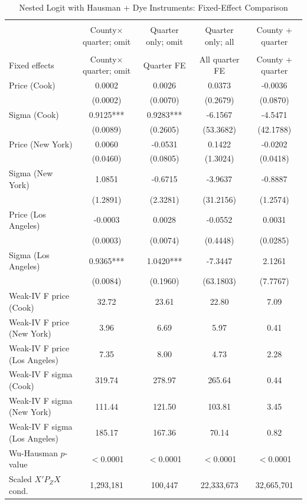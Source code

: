 \begin{table}[!htbp] \centering
  \caption{Nested Logit with Hausman + Dye Instruments: Fixed-Effect Comparison}
  \label{tab:nested_fe_comparison}
  \begin{tabular}{lcccc}
\\[-1.8ex]\hline
\hline \\[-1.8ex]
 & County$\times$quarter; omit & Quarter only; omit & Quarter only; all & County + quarter \\
\hline \\[-1.8ex]
Fixed effects & County$\times$quarter; omit & Quarter FE & All quarter FE & County + quarter \\
Price (Cook) & 0.0002 & 0.0026 & 0.0373 & -0.0036 \\
 & (0.0002) & (0.0070) & (0.2679) & (0.0870) \\
Sigma (Cook) & 0.9125*** & 0.9283*** & -6.1567 & -4.5471 \\
 & (0.0089) & (0.2605) & (53.3682) & (42.1788) \\
Price (New York) & 0.0060 & -0.0531 & 0.1422 & -0.0202 \\
 & (0.0460) & (0.0805) & (1.3024) & (0.0418) \\
Sigma (New York) & 1.0851 & -0.6715 & -3.9637 & -0.8887 \\
 & (1.2891) & (2.3281) & (31.2156) & (1.2574) \\
Price (Los Angeles) & -0.0003 & 0.0028 & -0.0552 & 0.0031 \\
 & (0.0003) & (0.0074) & (0.4448) & (0.0285) \\
Sigma (Los Angeles) & 0.9365*** & 1.0420*** & -7.3447 & 2.1261 \\
 & (0.0084) & (0.1960) & (63.1803) & (7.7767) \\
Weak-IV F price (Cook) & 32.72 & 23.61 & 22.80 & 7.09 \\
Weak-IV F price (New York) & 3.96 & 6.69 & 5.97 & 0.41 \\
Weak-IV F price (Los Angeles) & 7.35 & 8.00 & 4.73 & 2.28 \\
Weak-IV F sigma (Cook) & 319.74 & 278.97 & 265.64 & 0.44 \\
Weak-IV F sigma (New York) & 111.44 & 121.50 & 103.81 & 3.45 \\
Weak-IV F sigma (Los Angeles) & 185.17 & 167.36 & 70.14 & 0.82 \\
Wu-Hausman $p$-value & $<$0.0001 & $<$0.0001 & $<$0.0001 & $<$0.0001 \\
Scaled $X'P_ZX$ cond. & 1,293,181 & 100,447 & 22,333,673 & 32,665,701 \\

\end{tabular}
\end{table}
